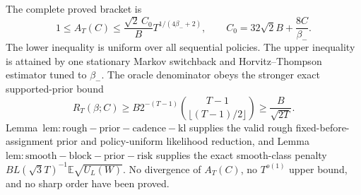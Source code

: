 The complete proved bracket is
\[
1\le A_T(C)\le\frac{\sqrt2\,C_0}{B}T^{1/(4\beta_-+2)},
\qquad C_0=32\sqrt2 B+\frac{8C}{\beta_-}.
\]
The lower inequality is uniform over all sequential policies. The upper inequality is attained by one stationary Markov switchback and Horvitz--Thompson estimator tuned to \(\beta_-\). The oracle denominator obeys the stronger exact supported-prior bound
\[
R_T(\beta;C)\ge B2^{-(T-1)}\binom{T-1}{\lfloor(T-1)/2\rfloor}\ge\frac{B}{\sqrt{2T}}.
\]
Lemma~\(\mathrm{lem:rough-prior-cadence-kl}\) supplies the valid rough fixed-before-assignment prior and policy-uniform likelihood reduction, and Lemma~\(\mathrm{lem:smooth-block-prior-risk}\) supplies the exact smooth-class penalty \(BL(\sqrt3 T)^{-1}\mathbb E\sqrt{U_L(W)}\). No divergence of \(A_T(C)\), no \(T^{o(1)}\) upper bound, and no sharp order have been proved.